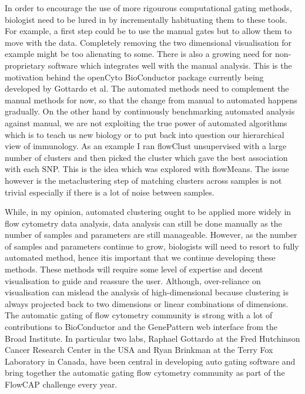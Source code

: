 In order to encourage the use of more rigourous computational gating methods, biologist need to be lured in by incrementally habituating them to these tools.
For example, a first step could be to use the manual gates but to allow them to move with the data.
Completely removing the two dimensional visualisation for example might be too alienating to some.
There is also a growing need for non-proprietary software which integrates well with the manual analysis.
This is the motivation behind the openCyto BioConductor package currently being developed by Gottardo et al.
The automated methods need to complement the manual methods for now, so that the change from manual to automated happens gradually.
On the other hand by continuously benchmarking automated analysis against manual, we are not exploiting the true power of automated algorithms which is to teach us new biology or to put back into question our hierarchical view of immunology.
As an example I ran flowClust unsupervised with a large number of clusters and then picked the cluster which gave the best association with each SNP.
This is the idea which was explored with flowMeans.  The issue however is the metaclustering step of matching clusters across samples is not trivial especially if
there is a lot of noise between samples.


While, in my opinion, automated clustering ought to be applied more widely in flow cytometry data analysis, data analysis can still be done manually as the number of samples and parameters are still manageable.
However, as the number of samples and parameters continue to grow, biologists will need to resort to fully automated method, hence itis important that we continue developing these methods.
These methods will require some level of expertise and decent visualisation to guide and reassure the user.
Although, over-reliance on visualisation can mislead the analysis of high-dimensional because clustering is always projected back to two dimensions or linear combinations of dimensions.
The automatic gating of flow cytometry community is strong with a lot of contributions to BioConductor and the GenePattern web interface from the Broad Institute.
In particular two labs, Raphael Gottardo at the Fred Hutchinson Cancer Research Center in the USA and Ryan Brinkman at the Terry Fox Laboratory in Canada, have been central in developing auto gating software and bring together the automatic gating flow cytometry community as part of the FlowCAP challenge every year.

